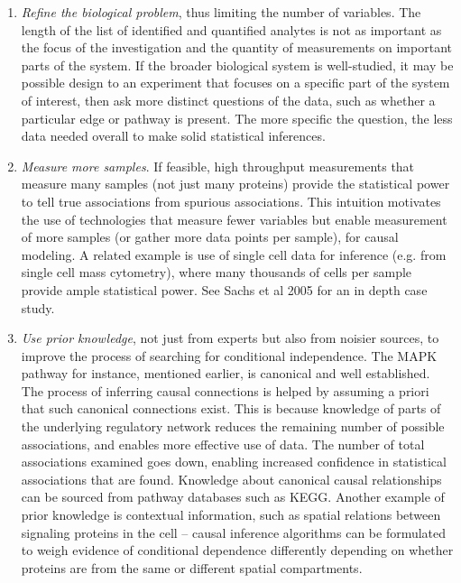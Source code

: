 \documentclass[journal=jacsat,manuscript=article]{achemso}
\begin{document}
\begin{enumerate}
\item \textit{Refine the biological problem}, thus limiting the number of variables.  The length of the list of identified and quantified analytes is not as important as the focus of the investigation and the quantity of measurements on important parts of the system.  If the broader biological system is well-studied, it may be possible design to an experiment that focuses on a specific part of the system of interest, then ask more distinct questions of the data, such as whether a particular edge or pathway is present.  The more specific the question, the less data needed overall to make solid statistical inferences.  
\item \textit{Measure more samples}.  If feasible, high throughput measurements that measure many samples (not just many proteins) provide the statistical power to tell true associations from spurious associations.  This intuition motivates the use of technologies that measure fewer variables but enable measurement of more samples (or gather more data points per sample), for causal modeling.  A related  example is  use of single cell data for inference (e.g. from single cell  mass cytometry), where  many thousands of cells per sample provide ample statistical power. See Sachs et al 2005 for an in depth case study.
\item \textit{Use prior knowledge}, not just from experts but also from noisier sources, to improve the process of searching for conditional independence.  The MAPK pathway for instance, mentioned earlier, is canonical and well established.  The process of inferring causal connections is helped by assuming a priori that such canonical connections exist. This is because knowledge of parts of the underlying regulatory network reduces the remaining number of possible associations, and enables more effective use of data. The number of total associations examined goes down, enabling increased confidence in statistical associations that are found.  Knowledge about canonical causal relationships can be sourced from pathway databases such as KEGG. Another example of prior knowledge is contextual information, such as spatial relations between  signaling proteins in the cell -- causal inference algorithms can be formulated to weigh evidence of conditional dependence differently depending on whether proteins are from the same or different spatial compartments. 

\end{enumerate}
\end{document}
